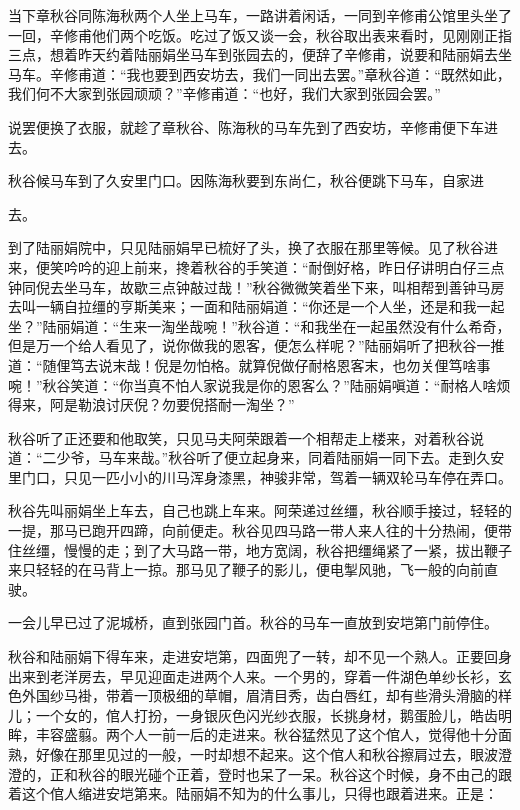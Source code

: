 \documentclass[12pt,UTF8]{ctexbook}
\begin{document}
{{{当下章秋谷同陈海秋两个人坐上马车，一路讲着闲话，一同到辛修甫公馆里头坐了一回，辛修甫他们两个吃饭。吃过了饭又谈一会，秋谷取出表来看时，见刚刚正指三点，想着昨天约着陆丽娟坐马车到张园去的，便辞了辛修甫，说要和陆丽娟去坐马车。辛修甫道：“我也要到西安坊去，我们一同出去罢。”章秋谷道：“既然如此，我们何不大家到张园顽顽？”辛修甫道：“也好，我们大家到张园会罢。”

说罢便换了衣服，就趁了章秋谷、陈海秋的马车先到了西安坊，辛修甫便下车进去。

秋谷候马车到了久安里门口。因陈海秋要到东尚仁，秋谷便跳下马车，自家进

去。

到了陆丽娟院中，只见陆丽娟早已梳好了头，换了衣服在那里等候。见了秋谷进来，便笑吟吟的迎上前来，搀着秋谷的手笑道：“耐倒好格，昨日仔讲明白仔三点钟同倪去坐马车，故歇三点钟敲过哉！”秋谷微微笑着坐下来，叫相帮到善钟马房去叫一辆自拉缰的亨斯美来；一面和陆丽娟道：“你还是一个人坐，还是和我一起坐？”陆丽娟道：“生来一淘坐哉啘！”秋谷道：“和我坐在一起虽然没有什么希奇，但是万一个给人看见了，说你做我的恩客，便怎么样呢？”陆丽娟听了把秋谷一推道：“随俚笃去说末哉！倪是勿怕格。就算倪做仔耐格恩客末，也勿关俚笃啥事啘！”秋谷笑道：“你当真不怕人家说我是你的恩客么？”陆丽娟嗔道：“耐格人啥烦得来，阿是勒浪讨厌倪？勿要倪搭耐一淘坐？”

秋谷听了正还要和他取笑，只见马夫阿荣跟着一个相帮走上楼来，对着秋谷说道：“二少爷，马车来哉。”秋谷听了便立起身来，同着陆丽娟一同下去。走到久安里门口，只见一匹小小的川马浑身漆黑，神骏非常，驾着一辆双轮马车停在弄口。

秋谷先叫丽娟坐上车去，自己也跳上车来。阿荣递过丝缰，秋谷顺手接过，轻轻的一提，那马已跑开四蹄，向前便走。秋谷见四马路一带人来人往的十分热闹，便带住丝缰，慢慢的走；到了大马路一带，地方宽阔，秋谷把缰绳紧了一紧，拔出鞭子来只轻轻的在马背上一掠。那马见了鞭子的影儿，便电掣风驰，飞一般的向前直驶。

一会儿早已过了泥城桥，直到张园门首。秋谷的马车一直放到安垲第门前停住。

秋谷和陆丽娟下得车来，走进安垲第，四面兜了一转，却不见一个熟人。正要回身出来到老洋房去，早见迎面走进两个人来。一个男的，穿着一件湖色单纱长衫，玄色外国纱马褂，带着一顶极细的草帽，眉清目秀，齿白唇红，却有些滑头滑脑的样儿；一个女的，倌人打扮，一身银灰色闪光纱衣服，长挑身材，鹅蛋脸儿，皓齿明眸，丰容盛翦。两个人一前一后的走进来。秋谷猛然见了这个倌人，觉得他十分面熟，好像在那里见过的一般，一时却想不起来。这个倌人和秋谷擦肩过去，眼波澄澄的，正和秋谷的眼光碰个正着，登时也呆了一呆。秋谷这个时候，身不由己的跟着这个倌人缩进安垲第来。陆丽娟不知为的什么事儿，只得也跟着进来。正是：

}}}
\end{document}
